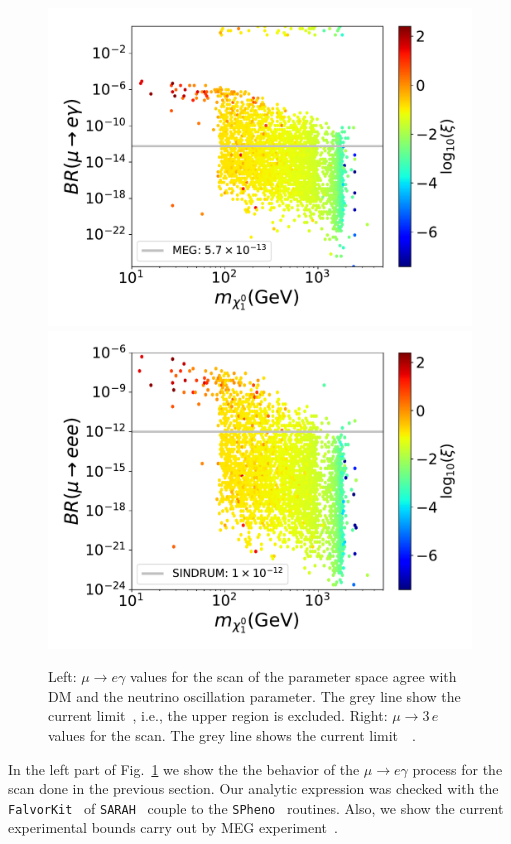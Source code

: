 \documentclass[12pt,letterpaper]{article}
\begin{document}
\begin{figure}
\begin{center}
\includegraphics[scale=0.43]{ueg_with_neutrino_physics}
\includegraphics[scale=0.43]{u3e_with_neutrino_physics}
\caption{Left: $\mu\rightarrow e\gamma$ values for the scan of the parameter space agree with DM and the neutrino oscillation parameter. The grey line show the current limit~\cite{Adam:2013mnn}, i.e., the upper region is excluded.
Right: $\mu\rightarrow 3\,e$ values for the scan. The grey line shows the current limit~~\cite{Bertl:1985mw}.}
\label{fig:ueg-e3e}
\end{center}
\end{figure}
In the left part of Fig.~\ref{fig:ueg-e3e} we show the the behavior of the $\mu\rightarrow e\gamma$ process for the scan done in the previous section. Our analytic expression was checked with the \texttt{FalvorKit}~\cite{Porod:2014xia} of \texttt{SARAH}~\cite{Staub:2008uz,Staub:2009bi,Staub:2010jh,Staub:2012pb,Staub:2013tta} couple to the \texttt{SPheno}~\cite{Porod:2003um,Porod:2011nf} routines. Also, we show the current experimental bounds carry out by MEG experiment~\cite{Adam:2013mnn}. 
\end{document}
